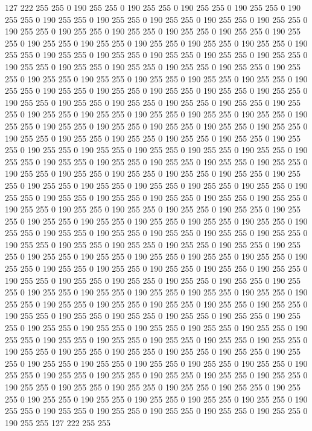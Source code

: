 127 222 255 255 0 190 255 255 0 190 255 255 0 190 255 255 0 190 255 255 0 190 255 255 0 190 255 255 0 190 255 255 0 190 255 255 0 190 255 255 0 190 255 255 0 190 255 255 0 190 255 255 0 190 255 255 0 190 255 255 0 190 255 255 0 190 255 255 0 190 255 255 0 190 255 255 0 190 255 255 0 190 255 255 0 190 255 255 0 190 255 255 0 190 255 255 0 190 255 255 0 190 255 255 0 190 255 255 0 190 255 255 0 190 255 255 0 190 255 255 0 190 255 255 0 190 255 255 0 190 255 255 0 190 255 255 0 190 255 255 0 190 255 255 0 190 255 255 0 190 255 255 0 190 255 255 0 190 255 255 0 190 255 255 0 190 255 255 0 190 255 255 0 190 255 255 0 190 255 255 0 190 255 255 0 190 255 255 0 190 255 255 0 190 255 255 0 190 255 255 
0 190 255 255 0 190 255 255 0 190 255 255 0 190 255 255 0 190 255 255 0 190 255 255 0 190 255 255 0 190 255 255 0 190 255 255 0 190 255 255 0 190 255 255 0 190 255 255 0 190 255 255 0 190 255 255 0 190 255 255 0 190 255 255 0 190 255 255 0 190 255 255 0 190 255 255 0 190 255 255 0 190 255 255 0 190 255 255 0 190 255 255 0 190 255 255 0 190 255 255 0 190 255 255 0 190 255 255 0 190 255 255 0 190 255 255 0 190 255 255 0 190 255 255 0 190 255 255 0 190 255 255 0 190 255 255 0 190 255 255 0 190 255 255 0 190 255 255 0 190 255 255 0 190 255 255 0 190 255 255 0 190 255 255 0 190 255 255 0 190 255 255 0 190 255 255 0 190 255 255 0 190 255 255 0 190 255 255 0 190 255 255 0 190 255 255 0 190 255 255 
0 190 255 255 0 190 255 255 0 190 255 255 0 190 255 255 0 190 255 255 0 190 255 255 0 190 255 255 0 190 255 255 0 190 255 255 0 190 255 255 0 190 255 255 0 190 255 255 0 190 255 255 0 190 255 255 0 190 255 255 0 190 255 255 0 190 255 255 0 190 255 255 0 190 255 255 0 190 255 255 0 190 255 255 0 190 255 255 0 190 255 255 0 190 255 255 0 190 255 255 0 190 255 255 0 190 255 255 0 190 255 255 0 190 255 255 0 190 255 255 0 190 255 255 0 190 255 255 0 190 255 255 0 190 255 255 0 190 255 255 0 190 255 255 0 190 255 255 0 190 255 255 0 190 255 255 0 190 255 255 0 190 255 255 0 190 255 255 0 190 255 255 0 190 255 255 0 190 255 255 0 190 255 255 0 190 255 255 0 190 255 255 0 190 255 255 0 190 255 255 
0 190 255 255 0 190 255 255 0 190 255 255 0 190 255 255 0 190 255 255 0 190 255 255 0 190 255 255 0 190 255 255 0 190 255 255 0 190 255 255 0 190 255 255 0 190 255 255 0 190 255 255 0 190 255 255 0 190 255 255 0 190 255 255 0 190 255 255 0 190 255 255 0 190 255 255 0 190 255 255 0 190 255 255 0 190 255 255 0 190 255 255 0 190 255 255 0 190 255 255 0 190 255 255 0 190 255 255 0 190 255 255 0 190 255 255 0 190 255 255 0 190 255 255 0 190 255 255 0 190 255 255 0 190 255 255 0 190 255 255 0 190 255 255 0 190 255 255 0 190 255 255 0 190 255 255 0 190 255 255 0 190 255 255 0 190 255 255 0 190 255 255 0 190 255 255 0 190 255 255 0 190 255 255 0 190 255 255 0 190 255 255 0 190 255 255 127 222 255 255 
